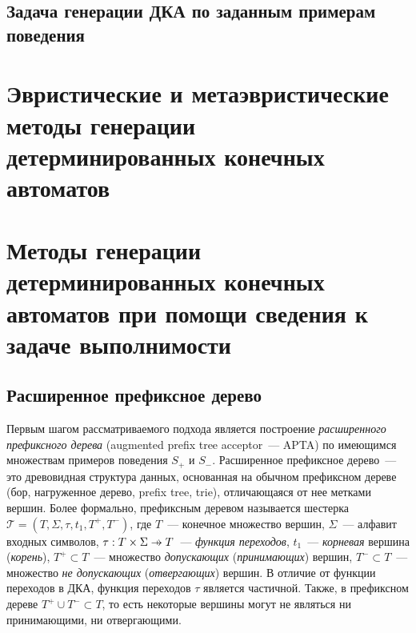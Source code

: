
\subsection{Задача генерации ДКА по заданным примерам поведения}
\label{sec:review:dfa-inf:task}




\section{Эвристические и метаэвристические методы генерации детерминированных конечных автоматов} 
\label{sec:review:heuristic-dfa-inf}



\section{Методы генерации детерминированных конечных автоматов при помощи сведения к задаче выполнимости} 
\label{sec:review:sat-dfa-inf} 


\subsection{Расширенное префиксное дерево}
\label{sec:review:sat-dfa-inf:apta}
Первым шагом рассматриваемого подхода является построение \emph{расширенного префиксного дерева} (augmented prefix tree acceptor~{---} APTA) по имеющимся множествам примеров поведения $S_{+}$ и $S_{-}$. 
Расширенное префиксное дерево~--- это древовидная структура данных, основанная на обычном префиксном дереве (бор, нагруженное дерево, prefix tree, trie), отличающаяся от нее метками вершин.
Более формально, префиксным деревом называется шестерка $\mathcal{T} = \left(T,\Sigma,\tau,t_{1},T^{+}, T^{-}\right)$, где $T$~{---} конечное множество вершин, $\Sigma$~{---} алфавит входных символов, $\tau: T \times \Sigma \pto T$~{---} \emph{функция переходов}, $t_{1}$~{---} \emph{корневая} вершина (\emph{корень}), $T^{+} \subset T$~{---} множество \emph{допускающих} (\emph{принимающих}) вершин, $T^{-} \subset T$~{---} множество \emph{не допускающих} (\emph{отвергающих}) вершин.
В отличие от функции переходов в ДКА, функция переходов $\tau$ является частичной. 
Также, в префиксном дереве $T^{+} \cup T^{-} \subset T$, то есть некоторые вершины могут не являться ни принимающими, ни отвергающими. 

